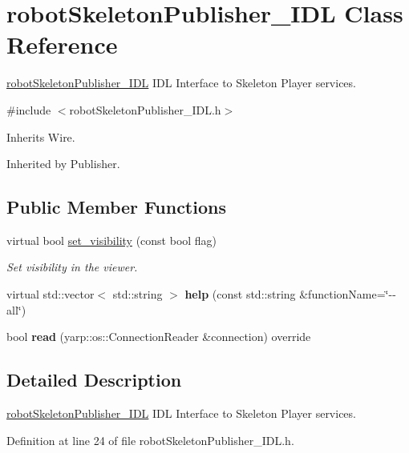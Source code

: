 \section{robot\+Skeleton\+Publisher\+\_\+\+I\+DL Class Reference}
\label{classrobotSkeletonPublisher__IDL}


\mbox{\hyperlink{classrobotSkeletonPublisher__IDL}{robot\+Skeleton\+Publisher\+\_\+\+I\+DL}} I\+DL Interface to Skeleton Player services.  




{\ttfamily \#include $<$robot\+Skeleton\+Publisher\+\_\+\+I\+D\+L.\+h$>$}



Inherits Wire.



Inherited by Publisher.

\subsection*{Public Member Functions}
\begin{DoxyCompactItemize}
\item 
virtual bool \mbox{\hyperlink{classrobotSkeletonPublisher__IDL_a4484695feff9f11dc7d773fe9a473612}{set\+\_\+visibility}} (const bool flag)
\begin{DoxyCompactList}\small\item\em Set visibility in the viewer. \end{DoxyCompactList}\item 
\mbox{\label{classrobotSkeletonPublisher__IDL_ad4d418e9f3bbd17a9fe51b571ba038ae}} 
virtual std\+::vector$<$ std\+::string $>$ {\bfseries help} (const std\+::string \&function\+Name=\char`\"{}-\/-\/all\char`\"{})
\item 
\mbox{\label{classrobotSkeletonPublisher__IDL_a3aab583eae6be30406d9c373fcb6c723}} 
bool {\bfseries read} (yarp\+::os\+::\+Connection\+Reader \&connection) override
\end{DoxyCompactItemize}


\subsection{Detailed Description}
\mbox{\hyperlink{classrobotSkeletonPublisher__IDL}{robot\+Skeleton\+Publisher\+\_\+\+I\+DL}} I\+DL Interface to Skeleton Player services. 

Definition at line 24 of file robot\+Skeleton\+Publisher\+\_\+\+I\+D\+L.\+h.



